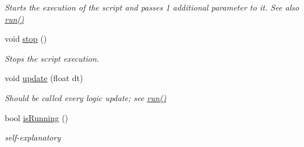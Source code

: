 \begin{DoxyCompactItemize}
\begin{DoxyCompactList}\small\item\em \-Starts the execution of the script and passes 1 additional parameter to it. \-See also \hyperlink{classObjectScriptExecutor_a328e3f4fe88be8a101f08a769beb88e4}{run()} \end{DoxyCompactList}\item 
\hypertarget{classObjectScriptExecutor_adb7ea47a741001ee23b8f563ed696282}{
void \hyperlink{classObjectScriptExecutor_adb7ea47a741001ee23b8f563ed696282}{stop} ()}
\label{de/d7c/classObjectScriptExecutor_adb7ea47a741001ee23b8f563ed696282}

\begin{DoxyCompactList}\small\item\em \-Stops the script execution. \end{DoxyCompactList}\item 
\hypertarget{classObjectScriptExecutor_a29498674490e773c26a9af5b0e19b9ce}{
void \hyperlink{classObjectScriptExecutor_a29498674490e773c26a9af5b0e19b9ce}{update} (float dt)}
\label{de/d7c/classObjectScriptExecutor_a29498674490e773c26a9af5b0e19b9ce}

\begin{DoxyCompactList}\small\item\em \-Should be called every logic update; see \hyperlink{classObjectScriptExecutor_a328e3f4fe88be8a101f08a769beb88e4}{run()} \end{DoxyCompactList}\item 
\hypertarget{classObjectScriptExecutor_a0a04b74bbb93b5682ffe3767d6e7e05f}{
bool \hyperlink{classObjectScriptExecutor_a0a04b74bbb93b5682ffe3767d6e7e05f}{is\-Running} ()}
\label{de/d7c/classObjectScriptExecutor_a0a04b74bbb93b5682ffe3767d6e7e05f}

\begin{DoxyCompactList}\small\item\em self-\/explanatory \end{DoxyCompactList}\end{DoxyCompactItemize}
